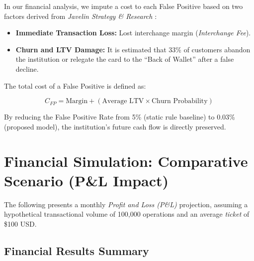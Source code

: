 \documentclass[12pt,a4paper]{report}
\begin{document}
In our financial analysis, we impute a cost to each False Positive based on two factors derived from \textit{Javelin Strategy \& Research} \cite{javelin2023b}:

\begin{itemize}
    \item \textbf{Immediate Transaction Loss:} Lost interchange margin (\textit{Interchange Fee}).
    \item \textbf{Churn and LTV Damage:} It is estimated that 33\% of customers abandon the institution or relegate the card to the \textquotedblleft Back of Wallet\textquotedblright{} after a false decline.
\end{itemize}

The total cost of a False Positive is defined as:

\[
C_{FP} = \text{Margin} + (\text{Average LTV} \times \text{Churn Probability})
\]

By reducing the False Positive Rate from 5\% (static rule baseline) to 0.03\% (proposed model), the institution's future cash flow is directly preserved.



\section{Financial Simulation: Comparative Scenario (P\&L Impact)}

The following presents a monthly \textit{Profit and Loss (P\&L)} projection, assuming a hypothetical transactional volume of 100,000 operations and an average \textit{ticket} of \$100 USD.

\subsection{Financial Results Summary}
\end{document}
